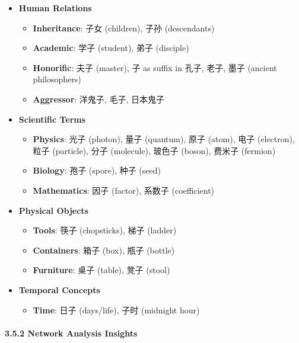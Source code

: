 \documentclass[
  11pt,
  letterpaper,
]{article}
\providecommand{\tightlist}{%
  \setlength{\itemsep}{0pt}\setlength{\parskip}{0pt}}
\begin{document}
\begin{itemize}
\tightlist
\item
  \textbf{Human Relations}

  \begin{itemize}
  \item
    \textbf{Inheritance}: 子女 (children), 子孙 (descendants)
  \item
    \textbf{Academic}: 学子 (student), 弟子 (disciple)
  \item
    \textbf{Honorific}: 夫子 (master), 子 as suffix in 孔子, 老子, 墨子
    (ancient philosophers)
  \item
    \textbf{Aggressor}: 洋鬼子, 毛子, 日本鬼子
  \end{itemize}
\item
  \textbf{Scientific Terms}

  \begin{itemize}
  \item
    \textbf{Physics}: 光子 (photon), 量子 (quantum), 原子 (atom), 电子
    (electron), 粒子 (particle), 分子 (molecule), 玻色子 (boson), 费米子
    (fermion)
  \item
    \textbf{Biology}: 孢子 (spore), 种子 (seed)
  \item
    \textbf{Mathematics}: 因子 (factor), 系数子 (coefficient)
  \end{itemize}
\item
  \textbf{Physical Objects}

  \begin{itemize}
  \item
    \textbf{Tools}: 筷子 (chopsticks), 梯子 (ladder)
  \item
    \textbf{Containers}: 箱子 (box), 瓶子 (bottle)
  \item
    \textbf{Furniture}: 桌子 (table), 凳子 (stool)
  \end{itemize}
\item
  \textbf{Temporal Concepts}

  \begin{itemize}
  \tightlist
  \item
    \textbf{Time}: 日子 (days/life), 子时 (midnight hour)
  \end{itemize}
\end{itemize}

\hypertarget{network-analysis-insights}{%
\paragraph{3.5.2 Network Analysis
Insights}\label{network-analysis-insights}}
\end{document}
